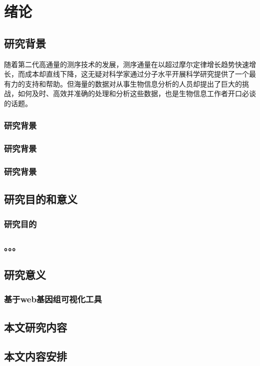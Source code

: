 \chapter{绪论}
	\section{研究背景}
	随着第二代高通量的测序技术的发展，测序通量在以超过摩尔定律增长趋势快速增长，而成本却直线下降，这无疑对科学家通过分子水平开展科学研究提供了一个最有力的支持和帮助。但海量的数据对从事生物信息分析的人员却提出了巨大的挑战，如何及时、高效并准确的处理和分析这些数据，也是生物信息工作者开口必谈的话题。\\
		\subsection{研究背景}
		\subsection{研究背景}
		\subsection{研究背景}	
	\section{研究目的和意义}
	\subsection{研究目的}
	
	\subsection{。。。}	
	\section{研究意义}
		\subsection{}
		
		\subsection{基于web基因组可视化工具}
		
	\section{本文研究内容}
		
		
	\section{本文内容安排}
	